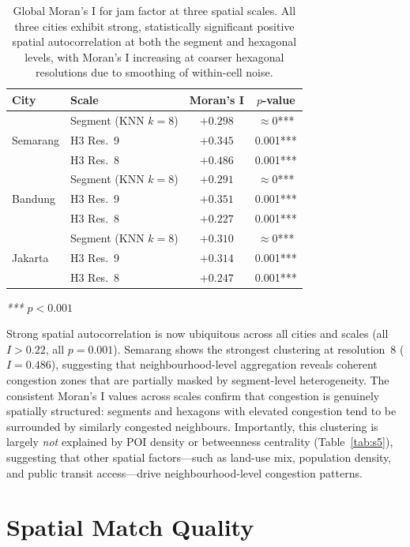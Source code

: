 \documentclass[preprint,12pt]{elsarticle}
\begin{document}
\begin{table}[!htbp]
\centering
\caption{Global Moran's I for jam factor at three spatial scales. All three cities exhibit strong, statistically significant positive spatial autocorrelation at both the segment and hexagonal levels, with Moran's I increasing at coarser hexagonal resolutions due to smoothing of within-cell noise.}
\label{tab:s6}
\begin{tabular}{llcc}
\toprule
City & Scale & Moran's I & $p$-value \\
\midrule
\multirow{3}{*}{Semarang}
 & Segment (KNN $k{=}8$)    & $+0.298$ & $\approx 0$*** \\
 & H3 Res.\ 9 & $+0.345$ & 0.001*** \\
 & H3 Res.\ 8 & $+0.486$ & 0.001*** \\
\midrule
\multirow{3}{*}{Bandung}
 & Segment (KNN $k{=}8$)    & $+0.291$ & $\approx 0$*** \\
 & H3 Res.\ 9 & $+0.351$ & 0.001*** \\
 & H3 Res.\ 8 & $+0.227$ & 0.001*** \\
\midrule
\multirow{3}{*}{Jakarta}
 & Segment (KNN $k{=}8$)    & $+0.310$ & $\approx 0$*** \\
 & H3 Res.\ 9 & $+0.314$ & 0.001*** \\
 & H3 Res.\ 8 & $+0.247$ & 0.001*** \\
\bottomrule
\end{tabular}

\smallskip
\noindent\textit{*** $p < 0.001$}
\end{table}

Strong spatial autocorrelation is now ubiquitous across all cities and scales (all $I > 0.22$, all $p = 0.001$). Semarang shows the strongest clustering at resolution~8 ($I = 0.486$), suggesting that neighbourhood-level aggregation reveals coherent congestion zones that are partially masked by segment-level heterogeneity. The consistent Moran's I values across scales confirm that congestion is genuinely spatially structured: segments and hexagons with elevated congestion tend to be surrounded by similarly congested neighbours. Importantly, this clustering is largely \emph{not} explained by POI density or betweenness centrality (Table~\ref{tab:s5}), suggesting that other spatial factors---such as land-use mix, population density, and public transit access---drive neighbourhood-level congestion patterns.

\section{Spatial Match Quality}
\label{sec:s5}
\end{document}
